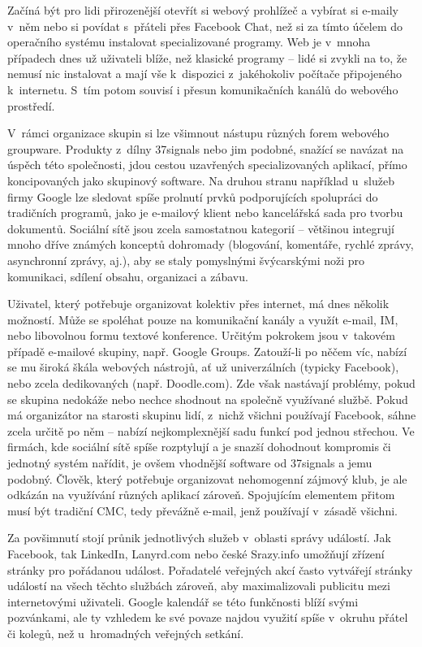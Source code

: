 \documentclass[12pt,oneside,final]{fithesis2}
\begin{document}
Začíná být pro lidi přirozenější otevřít si webový prohlížeč a vybírat si e-maily v~něm nebo si povídat s~přáteli přes Facebook Chat, než si za tímto účelem do operačního systému instalovat specializované programy. Web je v~mnoha případech dnes už uživateli blíže, než klasické programy -- lidé si zvykli na to, že nemusí nic instalovat a mají vše k~dispozici z~jakéhokoliv počítače připojeného k~internetu. S~tím potom souvisí i přesun komunikačních kanálů do webového prostředí.

V~rámci organizace skupin si lze všimnout nástupu různých forem webového groupware. Produkty z~dílny 37signals nebo jim podobné, snažící se navázat na úspěch této společnosti, jdou cestou uzavřených specializovaných aplikací, přímo koncipovaných jako skupinový software. Na druhou stranu například u~služeb firmy Google lze sledovat spíše prolnutí prvků podporujících spolupráci do tradičních programů, jako je e-mailový klient nebo kancelářská sada pro tvorbu dokumentů. Sociální sítě jsou zcela samostatnou kategorií -- většinou integrují mnoho dříve známých konceptů dohromady (blogování, komentáře, rychlé zprávy, asynchronní zprávy, aj.), aby se staly pomyslnými švýcarskými noži pro komunikaci, sdílení obsahu, organizaci a zábavu.

Uživatel, který potřebuje organizovat kolektiv přes internet, má dnes několik možností. Může se spoléhat pouze na komunikační kanály a využít e-mail, IM, nebo libovolnou formu textové konference. Určitým pokrokem jsou v~takovém případě e-mailové skupiny, např. Google Groups. Zatouží-li po něčem víc, nabízí se mu široká škála webových nástrojů, ať už univerzálních (typicky Facebook), nebo zcela dedikovaných (např. Doodle.com). Zde však nastávají problémy, pokud se skupina nedokáže nebo nechce shodnout na společně využívané službě. Pokud má organizátor na starosti skupinu lidí, z~nichž všichni používají Facebook, sáhne zcela určitě po něm -- nabízí nejkomplexnější sadu funkcí pod jednou střechou. Ve firmách, kde sociální sítě spíše rozptylují a je snazší dohodnout kompromis či jednotný systém nařídit, je ovšem vhodnější software od 37signals a jemu podobný. Člověk, který potřebuje organizovat nehomogenní zájmový klub, je ale odkázán na využívání různých aplikací zároveň. Spojujícím elementem přitom musí být tradiční CMC, tedy převážně e-mail, jenž používají v~zásadě všichni.

Za povšimnutí stojí průnik jednotlivých služeb v~oblasti správy událostí. Jak Facebook, tak LinkedIn, Lanyrd.com nebo české Srazy.info umožňují zřízení stránky pro pořádanou událost. Pořadatelé veřejných akcí často vytvářejí stránky událostí na všech těchto službách zároveň, aby maximalizovali publicitu mezi internetovými uživateli. Google kalendář se této funkčnosti blíží svými pozvánkami, ale ty vzhledem ke své povaze najdou využití spíše v~okruhu přátel či kolegů, než u~hromadných veřejných setkání.
\end{document}
